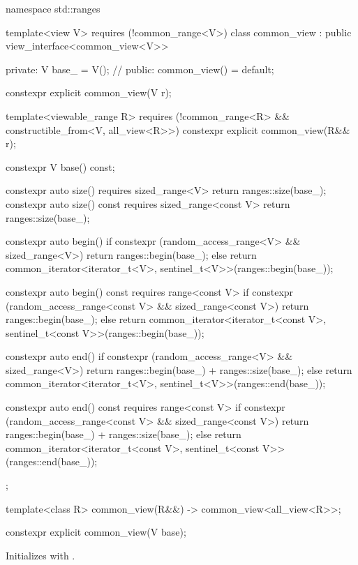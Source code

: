 %
\begin{codeblock}
namespace std::ranges {
  template<view V>
    requires (!common_range<V>)
  class common_view : public view_interface<common_view<V>> {
  private:
    V base_ = V();  // \expos
  public:
    common_view() = default;

    constexpr explicit common_view(V r);

    template<viewable_range R>
      requires (!common_range<R> && constructible_from<V, all_view<R>>)
    constexpr explicit common_view(R&& r);

    constexpr V base() const;

    constexpr auto size() requires sized_range<V> {
      return ranges::size(base_);
    }
    constexpr auto size() const requires sized_range<const V> {
      return ranges::size(base_);
    }

    constexpr auto begin() {
      if constexpr (random_access_range<V> && sized_range<V>)
        return ranges::begin(base_);
      else
        return common_iterator<iterator_t<V>, sentinel_t<V>>(ranges::begin(base_));
    }

    constexpr auto begin() const requires range<const V> {
      if constexpr (random_access_range<const V> && sized_range<const V>)
        return ranges::begin(base_);
      else
        return common_iterator<iterator_t<const V>, sentinel_t<const V>>(ranges::begin(base_));
    }

    constexpr auto end() {
      if constexpr (random_access_range<V> && sized_range<V>)
        return ranges::begin(base_) + ranges::size(base_);
      else
        return common_iterator<iterator_t<V>, sentinel_t<V>>(ranges::end(base_));
    }

    constexpr auto end() const requires range<const V> {
      if constexpr (random_access_range<const V> && sized_range<const V>)
        return ranges::begin(base_) + ranges::size(base_);
      else
        return common_iterator<iterator_t<const V>, sentinel_t<const V>>(ranges::end(base_));
    }
  };

  template<class R>
    common_view(R&&) -> common_view<all_view<R>>;
}
\end{codeblock}

%
\begin{itemdecl}
constexpr explicit common_view(V base);
\end{itemdecl}

\begin{itemdescr}
\pnum
\effects
Initializes  with .
\end{itemdescr}

